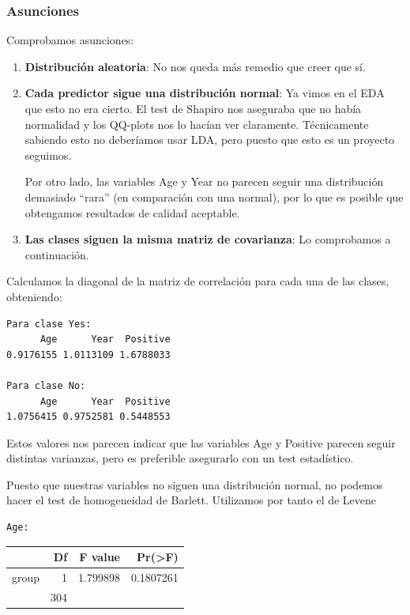 \subsubsection{Asunciones}
Comprobamos asunciones:
\begin{enumerate}
    \item \textbf{Distribución aleatoria}: No nos queda más remedio que creer que sí.
    \item \textbf{Cada predictor sigue una distribución normal}: Ya vimos en el EDA que esto no era cierto. El test de Shapiro nos aseguraba que no había normalidad y los QQ-plots nos lo hacían ver claramente. Técnicamente sabiendo esto no deberíamos usar LDA, pero puesto que esto es un proyecto seguimos.
    
    Por otro lado, las variables Age y Year no parecen seguir una distribución demasiado ``rara'' (en comparación con una normal), por lo que es posible que obtengamos resultados de calidad aceptable.
    \item \textbf{Las clases siguen la misma matriz de covarianza}: Lo comprobamos a continuación.
\end{enumerate}

Calculamos la diagonal de la matriz de correlación para cada una de las clases, obteniendo:
\begin{verbatim}
Para clase Yes:
      Age      Year  Positive 
0.9176155 1.0113109 1.6788033 

Para clase No:
      Age      Year  Positive 
1.0756415 0.9752581 0.5448553 
\end{verbatim}

\vspace{\baselineskip}

Estos valores nos parecen indicar que las variables Age y Positive parecen seguir distintas varianzas, pero es preferible asegurarlo con un test estadístico.

Puesto que nuestras variables no siguen una distribución normal, no podemos hacer el test de homogeneidad de Barlett. Utilizamos por tanto el de Levene
\begin{verbatim}
Age:
\end{verbatim}

\begin{tabular}{l|r|r|r}
\hline
  & Df & F value & Pr(>F)\\
\hline
group & 1 & 1.799898 & 0.1807261\\
\hline
 & 304 &  & \\
\hline
\end{tabular}


